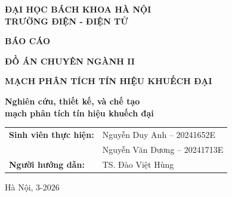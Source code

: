 \documentclass[12pt,a4paper]{report}
\begin{document}
\begin{titlepage}

    \begin{center}
        \vspace*{0.5cm}
        \large \textbf{ĐẠI HỌC BÁCH KHOA HÀ NỘI} \\
        \large \textbf{TRƯỜNG ĐIỆN - ĐIỆN TỬ}
        
        \vspace{2.5cm}
        \Huge \textbf{BÁO CÁO}
        
        \vspace{2cm}
        \large \textbf{ĐỒ ÁN CHUYÊN NGÀNH II}
        
        \vspace{0.5cm}
        \LARGE \textbf{MẠCH PHÂN TÍCH TÍN HIỆU KHUẾCH ĐẠI}
        
        \vspace{1.5cm}
        \large \textbf{Nghiên cứu, thiết kế, và chế tạo} \\
        \large \textbf{mạch phân tích tín hiệu khuếch đại}
        
        \vspace{2.5cm}
        \begin{table}[h]
            \centering
            \large
            \renewcommand{\arraystretch}{1.3}
            \begin{tabular}{ll}
                \textbf{Sinh viên thực hiện:} & Nguyễn Duy Anh – 20241652E \\
                                             & Nguyễn Văn Dương – 20241713E \\[0.5cm]
                \textbf{Người hướng dẫn:}     & TS. Đào Việt Hùng
            \end{tabular}
        \end{table}
        
        \vfill
        \large Hà Nội, 3-2026
        \vspace*{0.5cm}
    \end{center}
\end{titlepage}
\end{document}
